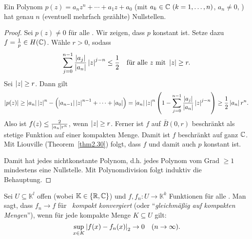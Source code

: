 \documentclass[a4paper,twoside,DIV15,BCOR12mm]{scrbook}
\begin{document}
\begin{kor} \label{kor2.31}
  Ein Polynom $p(z)=a_nz^n+\dotsb+a_1z+a_0$ (mit $a_k\in\mathbb{C}\ (k=1,\dotsc,n)$, $a_n\neq0$, ) hat genau $n$ (eventuell mehrfach gezählte) Nullstellen.
\end{kor}
\begin{proof}
  Sei $p(z)\neq0$ für alle . Wir zeigen, dass $p$ konstant ist. Setze dazu $f=\frac1p\in H(\mathbb{C})$. Wähle $r>0$, sodass
  \[ \sum_{j=0}^{n-1}{\frac{\left\lvert a_j\right\lvert}{\left\lvert a_n\right\lvert}\left\lvert z\right\lvert^{j-n}} \le \frac12 \quad \text{für alle $z$ mit } \left\lvert z\right\lvert \ge r. \]
  Sei $\left\lvert z\right\lvert \ge r$. Dann gilt
  \[ \left\lvert p(z)\right\lvert \ge \left\lvert a_n\right\lvert\left\lvert z\right\lvert^n - \left(\left\lvert a_{n-1}\right\lvert\left\lvert z\right\lvert^{n-1} + \dotsb + \left\lvert a_0\right\lvert\right) =
  \left\lvert a_n\right\lvert\left\lvert z\right\lvert^n \left(1-\sum_{j=0}^{n-1}{\frac{\left\lvert a_j\right\lvert}{\left\lvert a_n\right\lvert}\left\lvert z\right\lvert^{j-n}} \right) \ge
  \frac12\left\lvert a_n\right\lvert r^n.\]
  Also ist $f(z)\le \frac{2}{\left\lvert a_n\right\lvert r^n}$, wenn $\left\lvert z\right\lvert\ge r$. Ferner ist $f$ auf $\bar{B}(0,r)$ beschränkt als stetige
  Funktion auf einer kompakten Menge. Damit ist $f$ beschränkt auf ganz $\mathbb{C}$. Mit Liouville (Theorem~\ref{thm2.30}) folgt, dass $f$
  und damit auch $p$ konstant ist.

  Damit hat jedes nichtkonstante Polynom, d.h. jedes Polynom vom Grad $\ge1$ mindestens eine Nullstelle. Mit Polynomdivision
  folgt induktiv die Behauptung.
\end{proof}

\begin{dfn} \label{dfn2.32}
  Sei $U\subseteq\mathbb{K}^l$ offen (wobei $\mathbb{K}\in\{\mathbb{R},\mathbb{C}\}$) und $f,f_n\colon U\to\mathbb{K}^k$ Funktionen für alle
  . Man sagt, dass $f_n\to f$ für \ninf \ \emph{kompakt konvergiert} (oder "`\emph{gleichmäßig auf kompakten Mengen}"'),
  wenn für jede kompakte Menge $K\subseteq U$ gilt: \[ \sup_{x\in K}{\left\lvert f(x)-f_n(x)\right\lvert_2}\to0 \quad (n\rightarrow\infty). \]
\end{dfn}
\end{document}
